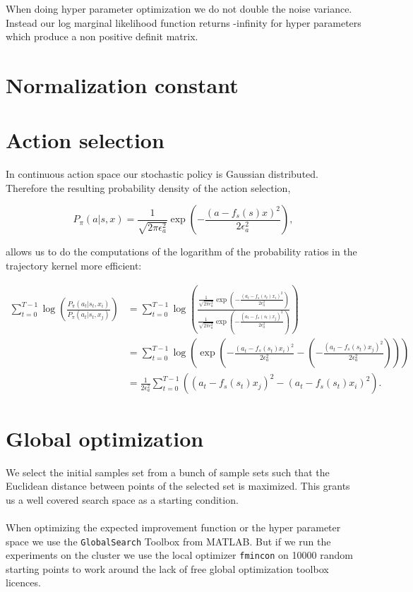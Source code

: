 When doing hyper parameter optimization we do not double the noise variance. Instead our log marginal likelihood function returns -infinity for hyper parameters which produce a non positive definit matrix.

\section{Normalization constant}

\section{Action selection}

In continuous action space our stochastic policy is Gaussian distributed. Therefore the resulting probability density of the action selection,

$$P_{\pi}(a|s,x) = \frac{1}{\sqrt{2\pi\epsilon_a^2}}\exp\left(-\frac{(a-f_s(s)x)^2}{2\epsilon_a^2}\right),$$

allows us to do the computations of the logarithm of the probability ratios in the trajectory kernel more efficient:

\begin{align*}
    \sum_{t=0}^{T-1} \log \left(\frac{P_{\pi}(a_{t}|s_{t},x_i)}{P_{\pi}(a_{t}|s_{t},x_j)}\right) &= \sum_{t=0}^{T-1} \log \left(\frac{\frac{1}{\sqrt{2\pi\epsilon_a^2}}\exp\left(-\frac{(a_t-f_s(s_t)x_i)^2}{2\epsilon_a^2}\right)}{\frac{1}{\sqrt{2\pi\epsilon_a^2}}\exp\left(-\frac{(a_t-f_s(s_t)x_j)^2}{2\epsilon_a^2}\right)}\right)\\
    &= \sum_{t=0}^{T-1} \log \left( \exp \left( -\frac{(a_t-f_s(s_t)x_i)^2}{2\epsilon_a^2} - \left(-\frac{(a_t-f_s(s_t)x_j)^2}{2\epsilon_a^2}\right)\right)\right)\\
    &= \frac{1}{2\epsilon_a^2} \sum_{t=0}^{T-1} \left((a_t-f_s(s_t)x_j)^2 - (a_t-f_s(s_t)x_i)^2\right).
\end{align*}




\section{Global optimization}
We select the initial samples set from a bunch of sample sets such that the Euclidean distance between points of the selected set is maximized. This grants us a well covered search space as a starting condition.
\\\\
When optimizing the expected improvement function or the hyper parameter space we use the \texttt{GlobalSearch} Toolbox from MATLAB. But if we run the experiments on the cluster we use the local optimizer \texttt{fmincon} on 10000 random starting points to work around the lack of free global optimization toolbox licences.


